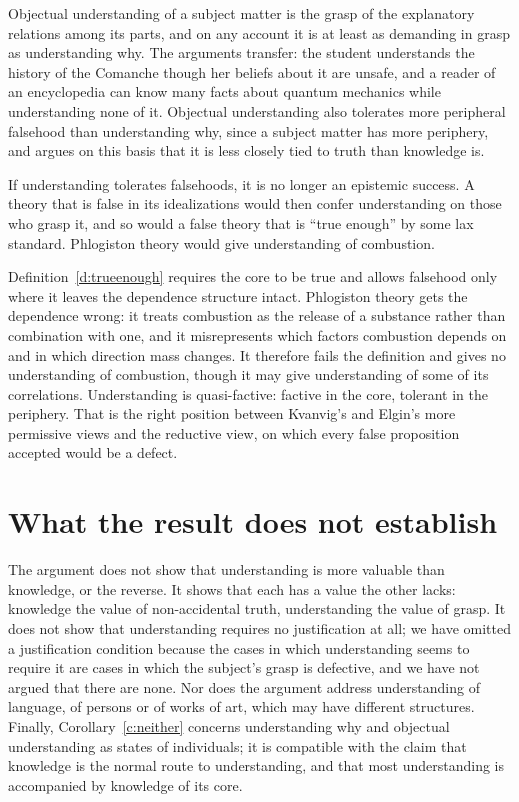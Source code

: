 \documentclass{situationist-preprint}
\begin{document}
\begin{reply}
Objectual understanding of a subject matter is the grasp of the explanatory relations among its parts, and on any account it is at least as demanding in grasp as understanding why. The arguments transfer: the student understands the history of the Comanche though her beliefs about it are unsafe, and a reader of an encyclopedia can know many facts about quantum mechanics while understanding none of it. Objectual understanding also tolerates more peripheral falsehood than understanding why, since a subject matter has more periphery, and \citet{Kvanvig2003} argues on this basis that it is less closely tied to truth than knowledge is.
\end{reply}

\begin{objection}[Factivity]\label{o:fact}
If understanding tolerates falsehoods, it is no longer an epistemic success. A theory that is false in its idealizations would then confer understanding on those who grasp it, and so would a false theory that is \enquote{true enough} by some lax standard. Phlogiston theory would give understanding of combustion.
\end{objection}

\begin{reply}
Definition~\ref{d:trueenough} requires the core to be true and allows falsehood only where it leaves the dependence structure intact. Phlogiston theory gets the dependence wrong: it treats combustion as the release of a substance rather than combination with one, and it misrepresents which factors combustion depends on and in which direction mass changes. It therefore fails the definition and gives no understanding of combustion, though it may give understanding of some of its correlations. Understanding is quasi-factive: factive in the core, tolerant in the periphery. That is the right position between Kvanvig's and Elgin's more permissive views and the reductive view, on which every false proposition accepted would be a defect.
\end{reply}

\section{What the result does not establish}

The argument does not show that understanding is more valuable than knowledge, or the reverse. It shows that each has a value the other lacks: knowledge the value of non-accidental truth, understanding the value of grasp. It does not show that understanding requires no justification at all; we have omitted a justification condition because the cases in which understanding seems to require it are cases in which the subject's grasp is defective, and we have not argued that there are none. Nor does the argument address understanding of language, of persons or of works of art, which may have different structures. Finally, Corollary~\ref{c:neither} concerns understanding why and objectual understanding as states of individuals; it is compatible with the claim that knowledge is the normal route to understanding, and that most understanding is accompanied by knowledge of its core.
\end{document}
